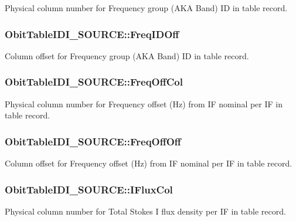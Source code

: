 Physical column number for Frequency group (AKA Band) ID in table record. 

\subsubsection{ {\bf Obit\-Table\-IDI\_\-SOURCE::Freq\-IDOff}}\label{structObitTableIDI__SOURCE_o30}


Column offset for Frequency group (AKA Band) ID in table record. 

\subsubsection{ {\bf Obit\-Table\-IDI\_\-SOURCE::Freq\-Off\-Col}}\label{structObitTableIDI__SOURCE_o63}


Physical column number for Frequency offset (Hz) from IF nominal per IF in table record. 

\subsubsection{ {\bf Obit\-Table\-IDI\_\-SOURCE::Freq\-Off\-Off}}\label{structObitTableIDI__SOURCE_o62}


Column offset for Frequency offset (Hz) from IF nominal per IF in table record. 

\subsubsection{ {\bf Obit\-Table\-IDI\_\-SOURCE::IFlux\-Col}}\label{structObitTableIDI__SOURCE_o53}


Physical column number for Total Stokes I flux density per IF in table record. 

